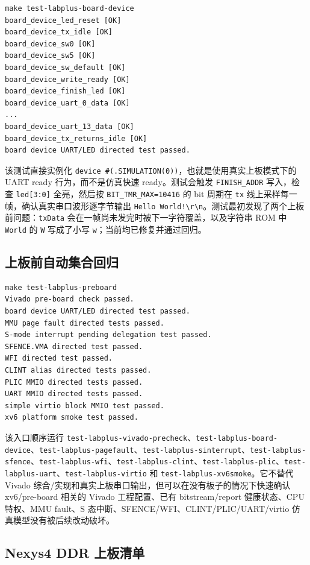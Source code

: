\documentclass[UTF8,a4paper,11pt]{ctexart}
\begin{document}
\begin{Verbatim}[fontsize=\small]
make test-labplus-board-device
board_device_led_reset [OK]
board_device_tx_idle [OK]
board_device_sw0 [OK]
board_device_sw5 [OK]
board_device_sw_default [OK]
board_device_write_ready [OK]
board_device_finish_led [OK]
board_device_uart_0_data [OK]
...
board_device_uart_13_data [OK]
board_device_tx_returns_idle [OK]
board device UART/LED directed test passed.
\end{Verbatim}

该测试直接实例化 \texttt{device \#(.SIMULATION(0))}，也就是使用真实上板模式下的 UART ready 行为，而不是仿真快速 ready。测试会触发 \texttt{FINISH\_ADDR} 写入，检查 \texttt{led[3:0]} 全亮，然后按 \texttt{BIT\_TMR\_MAX=10416} 的 bit 周期在 \texttt{tx} 线上采样每一帧，确认真实串口波形逐字节输出 \texttt{Hello World!\textbackslash r\textbackslash n}。测试最初发现了两个上板前问题：\texttt{txData} 会在一帧尚未发完时被下一字符覆盖，以及字符串 ROM 中 \texttt{World} 的 \texttt{W} 写成了小写 \texttt{w}；当前均已修复并通过回归。

\subsection{上板前自动集合回归}

\begin{Verbatim}[fontsize=\small]
make test-labplus-preboard
Vivado pre-board check passed.
board device UART/LED directed test passed.
MMU page fault directed tests passed.
S-mode interrupt pending delegation test passed.
SFENCE.VMA directed test passed.
WFI directed test passed.
CLINT alias directed tests passed.
PLIC MMIO directed tests passed.
UART MMIO directed tests passed.
simple virtio block MMIO test passed.
xv6 platform smoke test passed.
\end{Verbatim}

该入口顺序运行 \texttt{test-labplus-vivado-precheck}、\texttt{test-labplus-board-device}、\texttt{test-labplus-pagefault}、\texttt{test-labplus-sinterrupt}、\texttt{test-labplus-sfence}、\texttt{test-labplus-wfi}、\texttt{test-labplus-clint}、\texttt{test-labplus-plic}、\texttt{test-labplus-uart}、\texttt{test-labplus-virtio} 和 \texttt{test-labplus-xv6smoke}。它不替代 Vivado 综合/实现和真实上板串口输出，但可以在没有板子的情况下快速确认 xv6/pre-board 相关的 Vivado 工程配置、已有 bitstream/report 健康状态、CPU 特权、MMU fault、S 态中断、SFENCE/WFI、CLINT/PLIC/UART/virtio 仿真模型没有被后续改动破坏。

\subsection{Nexys4 DDR 上板清单}
\end{document}
